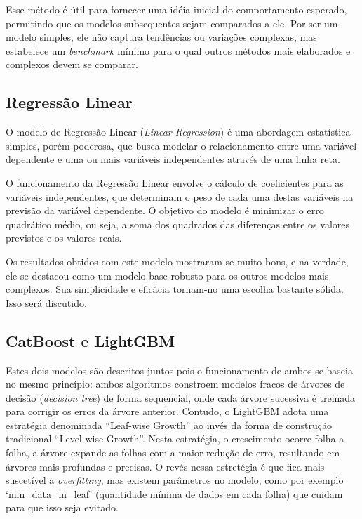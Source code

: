 Esse método é útil para fornecer uma idéia inicial do comportamento esperado, permitindo que os modelos subsequentes sejam comparados a ele. Por ser um modelo simples, ele não captura tendências ou variações complexas, mas estabelece um \textit{benchmark} mínimo para o qual outros métodos mais elaborados e complexos devem se comparar.

\subsection{Regressão Linear}

O modelo de Regressão Linear (\textit{Linear Regression}) é uma abordagem estatística simples, porém poderosa, que busca modelar o relacionamento entre uma variável dependente e uma ou mais variáveis independentes através de uma linha reta. 

O funcionamento da Regressão Linear envolve o cálculo de coeficientes para as variáveis independentes, que determinam o peso de cada uma destas variáveis na previsão da variável dependente. O objetivo do modelo é minimizar o erro quadrático médio, ou seja, a soma dos quadrados das diferenças entre os valores previstos e os valores reais.\cite{hyndman_fpp3_2024c}

Os resultados obtidos com este modelo mostraram-se muito bons, e na verdade, ele se destacou como um modelo-base robusto para os outros modelos mais complexos. Sua simplicidade e eficácia tornam-no uma escolha bastante sólida. Isso será discutido.


\subsection{CatBoost e LightGBM}

Estes dois modelos são descritos juntos pois o funcionamento de ambos se baseia no mesmo princípio: ambos algoritmos constroem modelos fracos de árvores de decisão (\textit{decision tree}) de forma sequencial, onde cada árvore sucessiva é treinada para corrigir os erros da árvore anterior. Contudo, o LightGBM adota uma estratégia denominada ``Leaf-wise Growth'' ao invés da forma de construção tradicional ``Level-wise Growth''. Nesta estratégia, o crescimento ocorre folha a folha, a árvore expande as folhas com a maior redução de erro, resultando em árvores mais profundas e precisas.\cite{ke2017lightgbm}\cite{LightGBM} O revés nessa estretégia é que fica mais suscetível a \textit{overfitting}, mas existem parâmetros no modelo, como por exemplo `min\_data\_in\_leaf' (quantidade mínima de dados em cada folha) que cuidam para que isso seja evitado.

